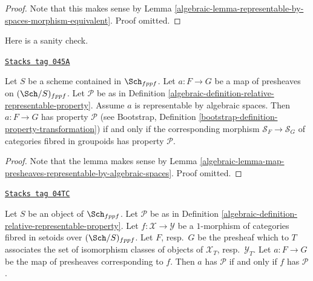 \begin{proof}

Note that this makes sense by
Lemma \ref{algebraic-lemma-representable-by-spaces-morphism-equivalent}.
Proof omitted.
\end{proof}

Here is a sanity check.

\begin{lemma}
\label{algebraic-lemma-map-presheaves-representable-by-spaces-transformation-property}
\href{https://stacks.math.columbia.edu/tag/045A}{\texttt{Stacks tag 045A}}

Let $S$ be a scheme contained in $\Sch_{fppf}$.
Let $a : F \to G$ be a map of presheaves on $(\Sch/S)_{fppf}$.
Let $\mathcal{P}$ be as in
Definition \ref{algebraic-definition-relative-representable-property}.
Assume $a$ is representable by algebraic spaces.
Then $a : F \to G$ has property $\mathcal{P}$ (see
Bootstrap, Definition \ref{bootstrap-definition-property-transformation})
if and only if the corresponding morphism
$\mathcal{S}_F \to \mathcal{S}_G$ of categories fibred in groupoids
has property $\mathcal{P}$.
\end{lemma}

\begin{proof}

Note that the lemma makes sense by
Lemma \ref{algebraic-lemma-map-presheaves-representable-by-algebraic-spaces}.
Proof omitted.
\end{proof}

\begin{lemma}
\label{algebraic-lemma-map-fibred-setoids-property}
\href{https://stacks.math.columbia.edu/tag/04TC}{\texttt{Stacks tag 04TC}}

Let $S$ be an object of $\Sch_{fppf}$. Let $\mathcal{P}$ be as in
Definition \ref{algebraic-definition-relative-representable-property}.
Let $f : \mathcal{X} \to \mathcal{Y}$ be a $1$-morphism of
categories fibred in setoids over $(\Sch/S)_{fppf}$.
Let $F$, resp.\ $G$ be the presheaf which to $T$ associates
the set of isomorphism classes of objects of
$\mathcal{X}_T$, resp.\ $\mathcal{Y}_T$.
Let $a : F \to G$ be the map of presheaves corresponding to $f$.
Then $a$ has $\mathcal{P}$ if and only if $f$ has $\mathcal{P}$.
\end{lemma}

